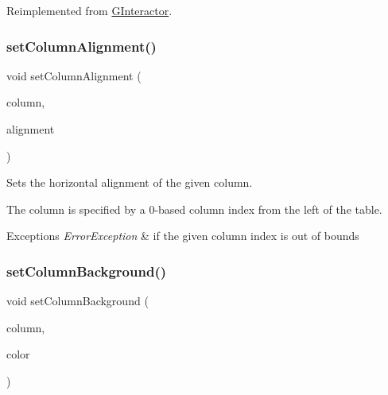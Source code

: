 Reimplemented from \mbox{\hyperlink{classGInteractor_a61374df6c11b52cfbb0815decdbaebc6}{G\+Interactor}}.

\mbox{\label{classGTable_a84b3f42bb5d010483b78b9fd7e9c55f0}} 
\subsubsection{\texorpdfstring{set\+Column\+Alignment()}{setColumnAlignment()}}
{\footnotesize\ttfamily void set\+Column\+Alignment (\begin{DoxyParamCaption}\item[{int}]{column,  }\item[{Horizontal\+Alignment}]{alignment }\end{DoxyParamCaption})\hspace{0.3cm}{\ttfamily [virtual]}}



Sets the horizontal alignment of the given column. 

The column is specified by a 0-\/based column index from the left of the table. 
\begin{DoxyExceptions}{Exceptions}
{\em Error\+Exception} & if the given column index is out of bounds \\
\hline
\end{DoxyExceptions}
\mbox{\label{classGTable_a48898e733d8ae3e285ff84d02e2cdee5}} 
\subsubsection{\texorpdfstring{set\+Column\+Background()}{setColumnBackground()}\hspace{0.1cm}{\footnotesize\ttfamily [1/2]}}
{\footnotesize\ttfamily void set\+Column\+Background (\begin{DoxyParamCaption}\item[{int}]{column,  }\item[{int}]{color }\end{DoxyParamCaption})\hspace{0.3cm}{\ttfamily [virtual]}}



